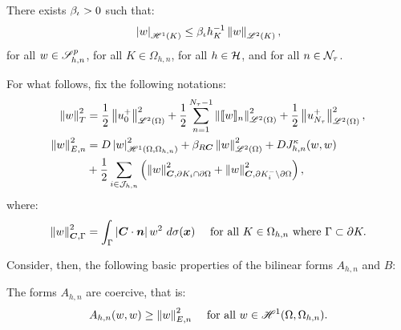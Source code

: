 \begin{lemma}
    There exists $\beta_{\iota} > 0$ such that:
    \begin{align}
        \left\lvert w \right\rvert_{\mathscr{H}^{1}(K)} \leq \beta_{\iota} h_K^{-1} \left\lVert w \right\rVert_{\mathscr{L}^{2}(K)},
    \end{align}
    for all $w \in \mathscr{S}^p_{h, n}$, for all $K \in \Omega_{h, n}$, for all $h \in \mathcal{H}$, and for all $n \in \mathcal{N}_{\tau}$.
\end{lemma}

For what follows, fix the following notations:
\begin{align} %
    \left\lVert w \right\rVert_{T}^2 &= \frac{1}{2} \left\lVert u_0^+ \right\rVert_{\SpaceLp{2}(\Omega)}^2 + \frac{1}{2} \sum_{n = 1}^{\nTimeIndices - 1} \left\lVert \Jump{w}_n \right\rVert_{\SpaceLp{2}(\Omega)}^2 + \frac{1}{2} \left\lVert u_{\nTimeIndices}^+ \right\rVert_{\SpaceLp{2}(\Omega)}^2, \\
    \left\lVert w \right\rVert_{E, n}^2 &= \Diffusion \left\lvert w \right\rvert_{\SpaceHk{1}(\Omega, \Omega_{h, n})}^2 + \BoundC{\Reaction \Convection} \left\lVert w \right\rVert_{\SpaceLp{2}(\Omega)}^2 + \Diffusion J^{\kappa}_{h, n}(w, w) \\
    &+ \frac{1}{2} \sum_{i \in \SpaceTimeIndices} \left( \left\lVert w \right\rVert_{\Convection, \partial K_i \cap \partial \Omega}^2 + \left\lVert w \right\rVert_{\Convection, \partial K_i^- \setminus \partial \Omega}^2 \right), \notag
\end{align}
where:
\begin{align}
    \left\lVert w \right\rVert_{\bm{C}, \Gamma}^2 &= \int_{\Gamma} \left\lvert \bm{C} \cdot \bm{n} \right\rvert w^2 ~ d \sigma(\bm{x}) &\text{ for all } K \in \Omega_{h, n} \text{ where } \Gamma \subset \partial K.
\end{align}

Consider, then, the following basic properties of the bilinear forms $A_{h, n}$ and $B$:

\begin{lemma}[Coercivity of $A_{h, n}$] \label{lemma:A_coercivity}
    The forms $A_{h, n}$ are coercive, that is:
    \begin{align}
        A_{h, n}(w, w) &\geq \left\lVert w \right\rVert_{E, n}^2 &\text{ for all } w \in \mathscr{H}^{1}(\Omega, \Omega_{h, n}).
    \end{align}
\end{lemma}

